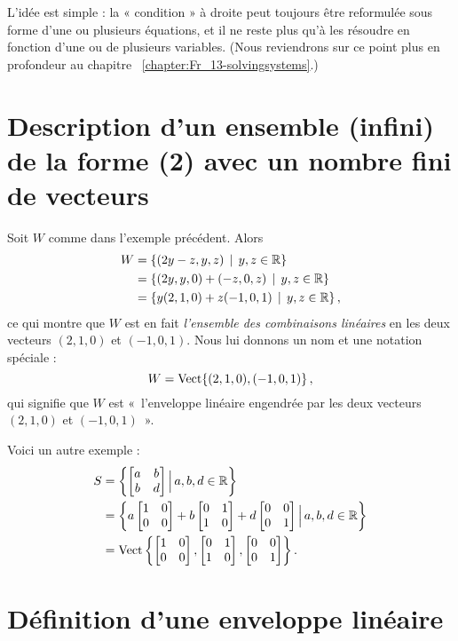 L'idée est simple : la « condition » à droite peut toujours être reformulée sous forme d'une ou plusieurs équations, et il ne reste plus qu'à les résoudre en fonction d'une ou de plusieurs variables.  (Nous reviendrons sur ce point plus en profondeur au chapitre  ~\ref{chapter:Fr_13-solvingsystems}.)

\section[Description d'un ensemble infini avec un nombre fini de vecteurs]{Description d'un ensemble (infini) de la forme (2) avec un nombre fini de vecteurs}

\begin{myexample} \label{ex6.2.1}  Soit $W$ comme dans l'exemple précédent. Alors
\begin{align*}
W &= \{ (2y-z,y,z) \, \mid \, y,z \in \mathbb{R}\}\\
&= \{ (2y, y,0) + (-z,0, z) \, \mid \, y,z\in\mathbb{R}\}\\
&= \{ y(2,1,0) + z(-1, 0,1) \, \mid \, y,z\in \mathbb{R}\}\,,
\end{align*}
ce qui montre que $W$ est en fait \emph{l'ensemble des combinaisons linéaires} en les deux vecteurs $(2,1,0)$
et $(-1,0,1)$. Nous lui donnons un nom et une notation spéciale :
$$
W = \textrm{Vect}\{ (2,1,0), (-1,0,1)\}\,,
$$
qui signifie que $W$ est «~l'enveloppe linéaire engendrée par les deux vecteurs $(2,1,0)$
et $(-1,0,1)$~». \end{myexample}

\begin{myexample}\label{ex6.2.2} Voici un autre exemple :
\begin{align*}
S &= \left\{  \left[ \begin{matrix} a & b\\ b & d \end{matrix} \right] \Big|\, a,b,d \in \mathbb{R}\right\}\\
&=  \left\{ a\left[ \begin{matrix} 1&0\\0&0 \end{matrix} \right] + b\left[ \begin{matrix} 0&1\\1&0 \end{matrix} \right] + d\left[ \begin{matrix} 0&0\\0&1 \end{matrix} \right]
 \Big|\, a,b,d \in \mathbb{R}\right\}\\
&= \textrm{Vect}\left\{ \left[ \begin{matrix} 1&0\\0&0 \end{matrix} \right],\left[ \begin{matrix} 0&1\\1&0 \end{matrix} \right],\left[ \begin{matrix} 0&0\\0&1 \end{matrix} \right]\right\}.
\end{align*}
\end{myexample}


\section{Définition d'une enveloppe linéaire}

